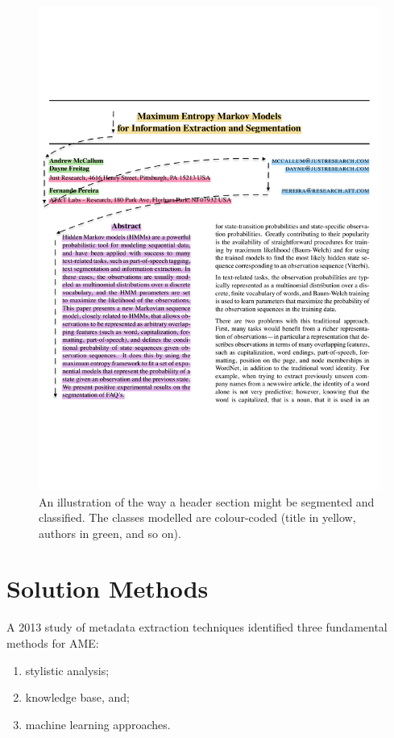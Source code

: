 \begin{figure}[!ht]
\center
\includegraphics[width=\textwidth]{Figures/extraction.pdf}
\caption{An illustration of the way a header section might be segmented and classified. The classes modelled are colour-coded (title in yellow, authors in green, and so on).}
\label{fig:grobid}
\end{figure}

\section{Solution Methods}

A 2013 study of metadata extraction techniques \cite{lipinski2013evaluation} identified three fundamental methods for AME:

\begin{enumerate}
\item stylistic analysis;
\item knowledge base, and;
\item machine learning approaches.
\end{enumerate}

